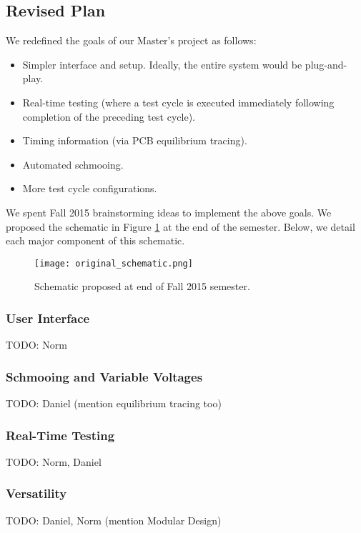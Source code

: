 \subsection{Revised Plan}
We redefined the goals of our Master's project as follows: 
\begin{itemize}
\item Simpler interface and setup. Ideally, the entire system would be plug-and-play.
\item Real-time testing (where a test cycle is executed immediately following completion of the preceding test cycle).
\item Timing information (via PCB equilibrium tracing).
\item Automated schmooing.
\item More test cycle configurations.
\end{itemize}

We spent Fall 2015 brainstorming ideas to implement the above goals. We proposed the schematic in Figure \ref{fig:f15_schematic} at the end of the semester. Below, we detail each major component of this schematic.

\begin{figure}
\texttt{[image: original\_schematic.png]}
\caption{Schematic proposed at end of Fall 2015 semester.}
\label{fig:f15_schematic}
\end{figure}

\subsubsection{User Interface}
TODO: Norm

\subsubsection{Schmooing and Variable Voltages}
TODO: Daniel (mention equilibrium tracing too)

\subsubsection{Real-Time Testing}
TODO: Norm, Daniel

\subsubsection{Versatility}
TODO: Daniel, Norm (mention Modular Design)

\newpage